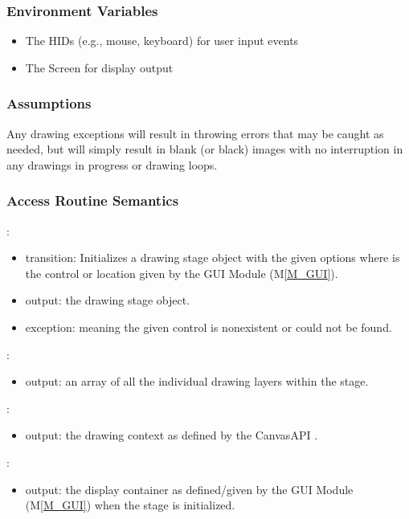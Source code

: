 \documentclass[12pt, titlepage]{article}
\newcommand{\mref}[1]{M\ref{#1}}
\newcommand{\mrefp}[1]{(\mref{#1})}
\newcommand{\mreff}[1]{Module \mrefp{#1}}
\begin{document}
\subsubsection{Environment Variables}
\begin{itemize}
  \item The HIDs (e.g., mouse, keyboard) for user input events
  \item The Screen for display output
\end{itemize}

\subsubsection{Assumptions}
Any drawing exceptions will result in throwing errors that may be caught as needed,
but will simply result in blank (or black) images with no interruption in any
drawings in progress or drawing loops.

\subsubsection{Access Routine Semantics}

\noindent {}:
\begin{itemize}
\item transition: Initializes a drawing stage object with the given options
  where  is the control or location given by the GUI \mreff{M_GUI}.
\item output: the drawing stage object.
\item exception:  meaning the given control is nonexistent or could not be found.
\end{itemize}

\noindent {}:
\begin{itemize}
\item output: an array of all the individual drawing layers within the stage.
\end{itemize}

\noindent {}:
\begin{itemize}
\item output: the drawing context as defined by the CanvasAPI \cite{html_std_canvas}.
\end{itemize}

\noindent {}:
\begin{itemize}
\item output: the display container as defined/given by the GUI \mreff{M_GUI} when the stage is initialized.
\end{itemize}
\end{document}
